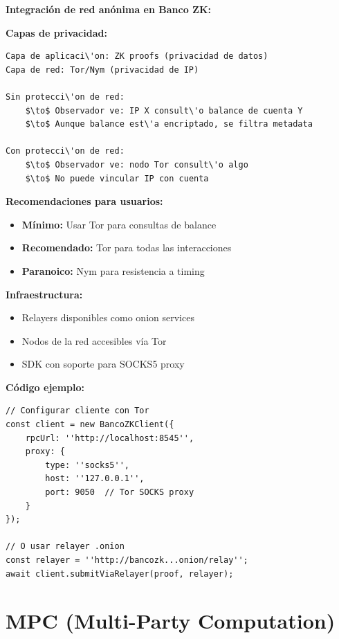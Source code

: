 \documentclass[11pt,a4paper,twoside]{book}
\begin{document}
\begin{bancozk}
\textbf{Integraci\'on de red an\'onima en Banco ZK:}

\textbf{Capas de privacidad:}

\begin{verbatim}
Capa de aplicaci\'on: ZK proofs (privacidad de datos)
Capa de red: Tor/Nym (privacidad de IP)

Sin protecci\'on de red:
    $\to$ Observador ve: IP X consult\'o balance de cuenta Y
    $\to$ Aunque balance est\'a encriptado, se filtra metadata

Con protecci\'on de red:
    $\to$ Observador ve: nodo Tor consult\'o algo
    $\to$ No puede vincular IP con cuenta
\end{verbatim}

\textbf{Recomendaciones para usuarios:}

\begin{itemize}
    \item \textbf{M\'inimo:} Usar Tor para consultas de balance
    \item \textbf{Recomendado:} Tor para todas las interacciones
    \item \textbf{Paranoico:} Nym para resistencia a timing
\end{itemize}

\textbf{Infraestructura:}

\begin{itemize}
    \item Relayers disponibles como onion services
    \item Nodos de la red accesibles v\'ia Tor
    \item SDK con soporte para SOCKS5 proxy
\end{itemize}

\textbf{C\'odigo ejemplo:}
\begin{verbatim}
// Configurar cliente con Tor
const client = new BancoZKClient({
    rpcUrl: ''http://localhost:8545'',
    proxy: {
        type: ''socks5'',
        host: ''127.0.0.1'',
        port: 9050  // Tor SOCKS proxy
    }
});

// O usar relayer .onion
const relayer = ''http://bancozk...onion/relay'';
await client.submitViaRelayer(proof, relayer);
\end{verbatim}
\end{bancozk}

\section{MPC (Multi-Party Computation)}
\label{sec:mpc}
\end{document}
